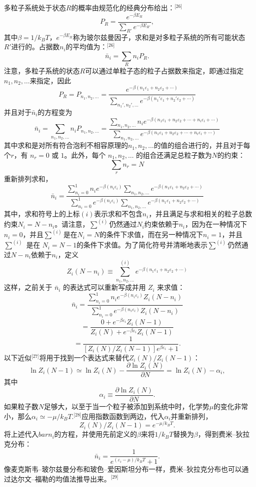 多粒子系统处于状态\(R\)的概率由规范化的经典分布给出：\(^\text{[26]}\)
\[
P_R = \frac{e^{-\beta E_R}}{\sum_{R'} e^{-\beta E_{R'}}},~
\]
其中\(\beta = 1/k_B T\)，\( e^{-\beta E_R} \)称为玻尔兹曼因子，求和是对多粒子系统的所有可能状态\(R'\)进行的。占据数\(n_i\)的平均值为：\(^\text{[26]}\)
\[
\bar{n}_i = \sum_R n_i P_R.~
\]
注意，多粒子系统的状态\(R\)可以通过单粒子态的粒子占据数来指定，即通过指定\( n_1, n_2, \ldots\)来指定，因此
\[
P_R = P_{n_1, n_2, \ldots} = \frac{e^{-\beta (n_1 \varepsilon_1 + n_2 \varepsilon_2 + \cdots )}}{\sum_{n_1', n_2', \ldots} e^{-\beta (n_1' \varepsilon_1 + n_2' \varepsilon_2 + \cdots )}}~
\]
并且对于\(\bar{n}_i\)的方程变为
\[
\bar{n}_i = \sum_{n_1, n_2, \dots} n_i P_{n_1, n_2, \dots} = \frac{\sum_{n_1, n_2, \dots} n_i e^{-\beta (n_1 \varepsilon_1 + n_2 \varepsilon_2 + \cdots + n_i \varepsilon_i + \cdots )}}{\sum_{n_1, n_2, \dots} e^{-\beta (n_1 \varepsilon_1 + n_2 \varepsilon_2 + \cdots + n_i \varepsilon_i + \cdots )}}~
\]
其中求和是对所有符合泡利不相容原理的\(n_1, n_2, \ldots\)的值的组合进行的，并且对于每个\( r \)，有 \( n_r = 0 \) 或 \( 1 \)。此外，每个 \( n_1, n_2, \ldots \) 的组合还满足总粒子数为\(N\)的约束：
\[
\sum_r n_r = N~
\]
重新排列求和，
\[
\bar{n}_i = \frac{\sum_{n_i=0}^{1} n_i e^{-\beta (n_i \varepsilon_i)} \sum_{n_1, n_2, \dots} e^{-\beta (n_1 \varepsilon_1 + n_2 \varepsilon_2 + \cdots )}}{\sum_{n_i=0}^{1} e^{-\beta (n_i \varepsilon_i)} \sum_{n_1, n_2, \dots} e^{-\beta (n_1 \varepsilon_1 + n_2 \varepsilon_2 + \cdots )}}~
\]
其中，求和符号上的上标\( (i) \)表示求和不包含\( n_i \)，并且满足与求和相关的粒子总数约束\( N_i = N - n_i \)。请注意，\( \sum^{(i)} \)仍然通过\( N_i \)约束依赖于\( n_i \)，因为在一种情况下\( n_i = 0 \)，并且\( \sum^{(i)} \)是在\( N_i = N \)的条件下求值，而在另一种情况下\( n_i = 1 \)，并且\( \sum^{(i)} \) 是在 \( N_i = N - 1 \)的条件下求值。为了简化符号并清晰地表示\( \sum^{(i)} \)仍然通过\( N - n_i \)依赖于\( n_i \)，定义
\[
Z_i(N - n_i) \equiv \sum^{(i)}_{n_1, n_2, \dots} e^{-\beta (n_1 \varepsilon_1 + n_2 \varepsilon_2 + \cdots )}~
\]
这样，之前关于 \( \bar{n}_i \) 的表达式可以重新写成并用 \( Z_i \) 来求值：
\[
\bar{n}_i = \frac{\sum_{n_i=0}^{1} n_i e^{-\beta (n_i \varepsilon_i)} Z_i(N - n_i)}{\sum_{n_i=0}^{1} e^{-\beta (n_i \varepsilon_i)} Z_i(N - n_i)}~
\]
\[= \frac{0 + e^{-\beta \varepsilon_i} Z_i(N - 1)}{Z_i(N) + e^{-\beta \varepsilon_i} Z_i(N - 1)}~
\]
\[
= \frac{1}{\left[Z_i(N)/Z_i(N - 1) \right] e^{\beta \varepsilon_i} + 1}.~
\]
以下近似\(^\text{[27]}\)将用于找到一个表达式来替代\(Z_i(N)/Z_i(N-1)\)：
\[
\ln Z_i(N-1) \simeq \ln Z_i(N) - \frac{\partial \ln Z_i(N)}{\partial N} = \ln Z_i(N) - \alpha_i,~
\]
其中
\[
\alpha_i \equiv \frac{\partial \ln Z_i(N)}{\partial N}.~
\]
如果粒子数\(N\)足够大，以至于当一个粒子被添加到系统中时，化学势\(\mu\)的变化非常小，那么\(\alpha_i \simeq -\mu/k_B T\).\(^\text{[28]}\)应用指数函数到两边，代入\(\alpha_i\)并重新排列，
\[
Z_i(N)/Z_i(N-1)= e^{-\mu / k_B T}.~
\]
将上述代入\( bar{n}_i\)的方程，并使用先前定义的\(\beta\)来将\(1/k_B T\)替换为\( \beta \)，得到费米–狄拉克分布：
\[
\bar{n}_i = \frac{1}{e^{(\varepsilon_i - \mu)/k_B T} + 1}.~
\]
像麦克斯韦–玻尔兹曼分布和玻色–爱因斯坦分布一样，费米–狄拉克分布也可以通过达尔文–福勒的均值法推导出来。\(^\text{[29]}\)

